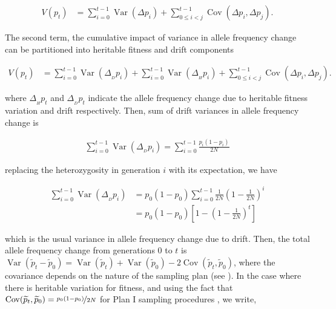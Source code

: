 \documentclass[11pt]{article}
\DeclareMathOperator{\var}{Var}
\DeclareMathOperator{\cov}{Cov}
\begin{document}
\begin{align}
  V(p_t) &= \sum_{i=0}^{t-1} \var(\Delta p_i) + \sum_{0 \le i < j}^{t-1} \cov(\Delta p_i, \Delta p_j).
\end{align}

The second term, the cumulative impact of variance in allele frequency change
can be partitioned into heritable fitness and drift components
\parencite{Santiago1995-hx,Buffalo2019-io}

\begin{align}
  V(p_t) &= \sum_{i=0}^{t-1} \var(\Delta_{_D} p_i) + \sum_{i=0}^{t-1} \var(\Delta_{_H} p_i) + \sum_{0 \le i < j}^{t-1} \cov(\Delta p_i, \Delta p_j).
\end{align}

where $\Delta_{_H} p_t$ and $\Delta_{_D} p_t$ indicate the allele frequency
change due to heritable fitness variation and drift respectively. Then, sum of
drift variances in allele frequency change is

\begin{align}
  \sum_{i=0}^{t-1} \var(\Delta_{_D} p_i) = \sum_{i=0}^{t-1} \frac{p_i(1-p_i)}{2N}
\end{align}

replacing the heterozygosity in generation $i$ with its expectation, we have

\begin{align}
  \sum_{i=0}^{t-1} \var(\Delta_{_D} p_i) &= p_0(1-p_0) \sum_{i=0}^{t-1} \frac{1}{2N} \left(1-\frac{1}{2N}\right)^i \\
                                         &= p_0(1-p_0) \left[1 - \left(1-\frac{1}{2N}\right)^t \right]
\end{align}

which is the usual variance in allele frequency change due to drift.  Then, the
total allele frequency change from generations $0$ to $t$ is
$\var(\widetilde{p}_t - \widetilde{p}_0) = \var(\widetilde{p}_t) +
\var(\widetilde{p}_0) - 2 \cov(\widetilde{p}_t, \widetilde{p}_0)$, where the
covariance depends on the nature of the sampling plan (see \cite{Nei1981-oy,
Waples1989-sj}). In the case where there is heritable variation for fitness,
and using the fact that $\cov(\widetilde{p}_t, \widetilde{p}_0) =
\nicefrac{p_0(1-p_0)}{2N}$ for Plan I sampling procedures
\parencite{Waples1989-sj}, we write,
\end{document}
